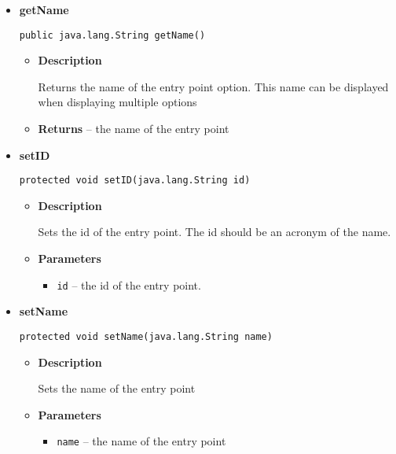 {{{{{{{{{{{{\begin{itemize}
{\begin{itemize}
{The id of an entry point should be an acronym of it's name.
}
\item{{\bf  Returns} -- 
the id 
}%
\end{itemize}
}%
\item{ 
{\bf  getName}\\
\begin{lstlisting}[frame=none]
public java.lang.String getName()\end{lstlisting} %
\begin{itemize}
\item{
{\bf  Description}

Returns the name of the entry point option. This name can be displayed when displaying multiple options
}
\item{{\bf  Returns} -- 
the name of the entry point 
}%
\end{itemize}
}%
\item{ 
{\bf  setID}\\
\begin{lstlisting}[frame=none]
protected void setID(java.lang.String id)\end{lstlisting} %
\begin{itemize}
\item{
{\bf  Description}

Sets the id of the entry point. The id should be an acronym of the name.
}
\item{
{\bf  Parameters}
  \begin{itemize}
   \item{
\texttt{id} -- the id of the entry point.}
  \end{itemize}
}%
\end{itemize}
}%
\item{ 
{\bf  setName}\\
\begin{lstlisting}[frame=none]
protected void setName(java.lang.String name)\end{lstlisting} %
\begin{itemize}
\item{
{\bf  Description}

Sets the name of the entry point
}
\item{
{\bf  Parameters}
  \begin{itemize}
   \item{
\texttt{name} -- the name of the entry point}
  \end{itemize}
}%
\end{itemize}
}%
\end{itemize}
}
}
}}}}}}}}}}
